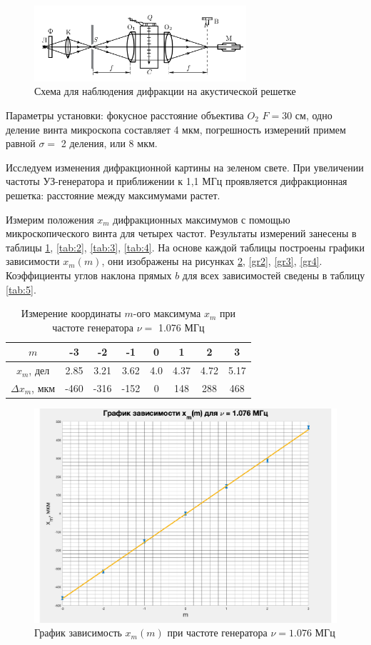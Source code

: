\documentclass[a4paper,12pt]{article}
\begin{document}
\begin{figure}[bhtp!]
	\centering	
	\includegraphics[width=0.7\textwidth]{shema1.png}
	\caption{Схема для наблюдения дифракции на акустической решетке}
	\label{shema1}
\end{figure}
	
Параметры установки: фокусное расстояние объектива $  O_2  $ $ F = 30 $ см, одно деление винта микроскопа составляет 4 мкм, погрешность измерений примем равной  $ \sigma = $ 2 деления, или 8 мкм.
	
Исследуем изменения дифракционной картины на зеленом свете. При увеличении частоты УЗ-генератора и приближении к 1,1 МГц проявляется дифракционная решетка: расстояние между максимумами растет.
	
Измерим положения $ x_m $ дифракционных максимумов с помощью микроскопического винта для четырех частот. Результаты измерений занесены в таблицы \ref{tab:1}, \ref{tab:2}, \ref{tab:3}, \ref{tab:4}. На основе каждой таблицы построены графики зависимости $ x_m (m) $, они изображены на рисунках \ref{gr1}, \ref{gr2}, \ref{gr3}, \ref{gr4}. Коэффициенты углов наклона прямых $b$ для всех зависимостей сведены в таблицу \ref{tab:5}. 
	
\begin{table}[bhtp!]
	\centering
	
	\begin{tabular}{|c|c|c|c|c|c|c|c|}
		\hline
		$m$&-3&-2&-1&0&1&2&3\\
		\hline
		$x_m$, дел&2.85&3.21&3.62&4.0&4.37&4.72&5.17\\
		\hline
		$\Delta x_m$, мкм&-460&-316&-152&0&148&288&468\\
		\hline
	\end{tabular}
	
	\caption{Измерение координаты $ m $-ого максимума $ x_m $ при частоте генератора $ \nu = $ 1.076 МГц}
	\label{tab:1}
\end{table}	
	
\begin{figure}[bhtp!]
	\centering
	\includegraphics[width=0.63\linewidth]{gr1.pdf}
	\caption{График зависимость $ x_m(m)$ при частоте генератора $\nu = 1.076$ МГц}
	\label{gr1}
\end{figure}
	
\end{document}
